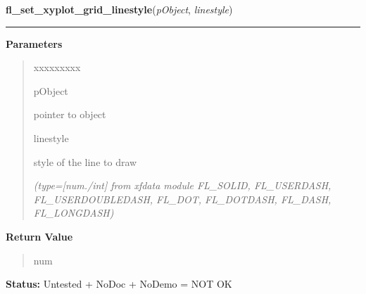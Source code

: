     \label{xformslib:library:fl_set_xyplot_grid_linestyle}

    \vspace{0.5ex}

\hspace{.8\funcindent}\begin{boxedminipage}{\funcwidth}

    \raggedright \textbf{fl\_set\_xyplot\_grid\_linestyle}(\textit{pObject}, \textit{linestyle})

    \vspace{-1.5ex}

    \rule{\textwidth}{0.5\fboxrule}
\setlength{\parskip}{2ex}
\setlength{\parskip}{1ex}
      \textbf{Parameters}
      \vspace{-1ex}

      \begin{quote}
        \begin{Ventry}{xxxxxxxxx}

          \item[pObject]

          pointer to object

          \item[linestyle]

          style of the line to draw

            {\it (type=[num./int] from xfdata module FL\_SOLID, FL\_USERDASH, FL\_USERDOUBLEDASH, 
FL\_DOT, FL\_DOTDASH, FL\_DASH, FL\_LONGDASH)}

        \end{Ventry}

      \end{quote}

      \textbf{Return Value}
    \vspace{-1ex}

      \begin{quote}
      num

      \end{quote}

\textbf{Status:} Untested + NoDoc + NoDemo = NOT OK



    \end{boxedminipage}

    \label{xformslib:library:fl_set_xyplot_alphaxtics}

